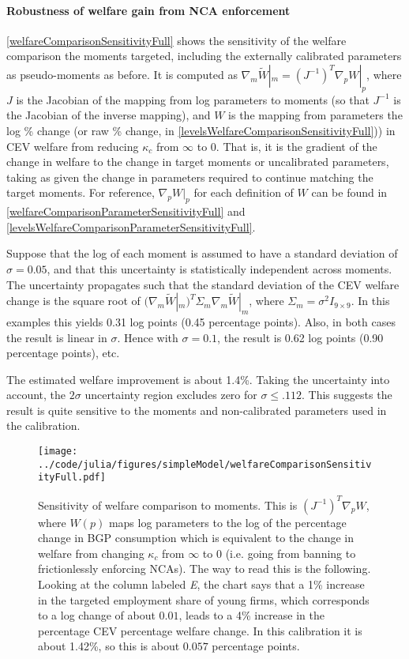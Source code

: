 \documentclass[11pt,english]{article}
\theoremstyle{remark}
\begin{document}
\paragraph{Robustness of welfare gain from NCA enforcement}

\autoref{welfareComparisonSensitivityFull} shows the sensitivity of the welfare comparison the moments targeted, including the externally calibrated parameters as pseudo-moments as before. It is computed as $\nabla_m \tilde{W}|_m = (J^{-1})^T \nabla_p W|_p$, where $J$ is the Jacobian of the mapping from log parameters to moments (so that $J^{-1}$ is the Jacobian of the inverse mapping), and $W$ is the mapping from parameters the log \% change (or raw \% change, in \autoref{levelsWelfareComparisonSensitivityFull})) in CEV welfare from reducing $\kappa_c$ from $\infty$ to $0$. That is, it is the gradient of the change in welfare to the change in target moments or uncalibrated parameters, taking as given the change in parameters required to continue matching the target moments. For reference, $\nabla_p W|_p$  for each definition of $W$ can be found in \autoref{welfareComparisonParameterSensitivityFull} and \autoref{levelsWelfareComparisonParameterSensitivityFull}.

Suppose that the log of each moment is assumed to have a standard deviation of $\sigma = 0.05$, and that this uncertainty is statistically independent across moments. The uncertainty propagates such that the standard deviation of the CEV welfare change is the square root of $(\nabla_m \tilde{W}|_m)^T \Sigma_m \nabla_m \tilde{W}|_m$, where $\Sigma_m = \sigma^2 I_{9\times 9}$. In this examples this yields 0.31 log points (0.45 percentage points). Also, in both cases the result is linear in $\sigma$. Hence with $\sigma = 0.1$, the result is 0.62 log points (0.90 percentage points), etc. 

The estimated welfare improvement is about 1.4\%. Taking the uncertainty into account, the $2\sigma$ uncertainty region excludes zero for $\sigma \le .112$. This suggests the result is quite sensitive to the moments and non-calibrated parameters used in the calibration. 


\begin{figure}[]
	\texttt{[image: ../code/julia/figures/simpleModel/welfareComparisonSensitivityFull.pdf]}
	\caption{Sensitivity of welfare comparison to moments. This is $(J^{-1})^T \nabla_p W$, where $W(p)$ maps log parameters to the log of the percentage change in BGP consumption which is equivalent to the change in welfare from changing $\kappa_c$ from $\infty$ to $0$ (i.e. going from banning to frictionlessly enforcing NCAs). The way to read this is the following. Looking at the column labeled \textit{E}, the chart says that a 1\% increase in the targeted employment share of young firms, which corresponds to a log change of about $0.01$, leads to a 4\% increase in the percentage CEV percentage welfare change. In this calibration it is about 1.42\%, so this is about $0.057$ percentage points.}
	\label{welfareComparisonSensitivityFull}
\end{figure}
\end{document}

